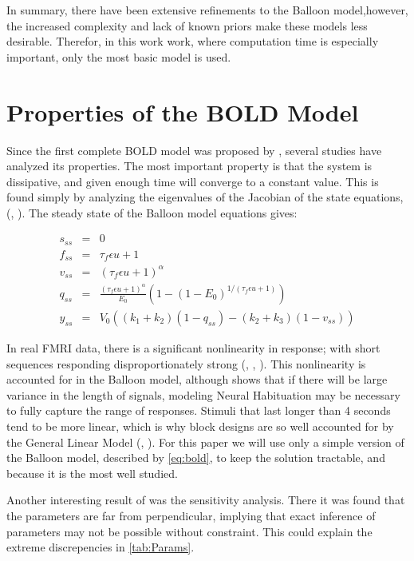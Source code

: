In summary, there have been extensive refinements to the Balloon
model,however, the increased complexity and lack of known priors 
make these models less desirable. Therefor, in this work
work, where computation time is especially important, only the 
most basic model is used.

\section{Properties of the BOLD Model}
\label{sec:BOLD Analysis}
Since the first complete BOLD model was proposed by \cite{Friston2002}, 
several studies have analyzed its properties. 
The most important property is that the system is dissipative, and given
enough time will converge to a constant value. This is found simply by
analyzing the eigenvalues of the Jacobian of the state equations, 
(\cite{Deneux2006}, \cite{Hu2009}). The steady state of the Balloon
model equations gives:

\begin{eqnarray}
s_{ss} &=& 0 \nonumber \\
f_{ss} &=& \tau_f\epsilon u + 1\nonumber \\
v_{ss} &=& (\tau_f\epsilon u + 1)^\alpha\nonumber \\
q_{ss} &=& \frac{(\tau_f\epsilon u + 1)^\alpha}{E_0}(1-(1-E_0)^{1/(\tau_f\epsilon u + 1)})\nonumber \\
y_{ss} &=& V_0((k_1+k_2)(1-q_{ss}) - (k_2+k_3)(1-v_{ss}))
\label{eq:steadystate}
\end{eqnarray}

In real FMRI data, there is a significant nonlinearity in response; with short sequences
responding disproportionately strong (\cite{Birn2001}, \cite{Wager2005}, \cite{Deneux2006}).
This nonlinearity is accounted for in the Balloon model, although \cite{Deneux2006}
shows that if there will be large variance in the length of signals, 
modeling Neural Habituation may be necessary to fully capture the range of responses. 
Stimuli that last longer than 4 seconds 
tend to be more linear, which is why block designs are so well accounted for
by the General Linear Model (\cite{Birn2001}, \cite{Deneux2006}). For this 
paper we will use only a simple version of the Balloon model, described by
\autoref{eq:bold}, to keep the solution tractable, and because it is the most
well studied. 

Another interesting result of \cite{Deneux2006} was the sensitivity analysis.
There it was found that the parameters are far from perpendicular,
implying that exact inference of parameters may not be possible without
constraint. This could explain the extreme discrepencies in \autoref{tab:Params}.

